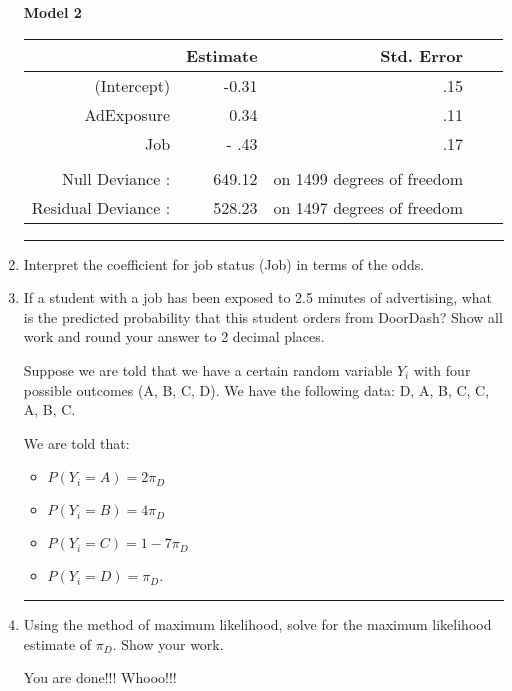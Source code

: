 \documentclass[11pt]{article}
\begin{document}
\begin{enumerate}
\pagebreak



\textbf{Model 2} 

\begin{center}
\begin{tabular}{rrrrr}
  \hline
             & Estimate & Std. Error \\
  \hline
(Intercept)    & -0.31 & .15    \\
 AdExposure    & 0.34 & .11 \\
 Job           & - .43 & .17 \\ 
  \hline
  & & \\ 
  Null Deviance : & 649.12 &  on 1499 degrees of freedom \\
  Residual Deviance : & 528.23 &   on 1497 degrees of freedom \\
\end{tabular}
\end{center}

\rule{\textwidth}{1pt}

\item Interpret the coefficient for job status (Job) in terms of the odds. 

\vspace{3cm}

\item If a student with a job has been exposed to 2.5 minutes of advertising, what is the predicted probability that this student orders from DoorDash? Show all work and round your answer to 2 decimal places. 


\pagebreak



Suppose we are told that we have a certain random variable $Y_i$ with four possible outcomes (A, B, C, D). We have the following data: D, A, B, C, C, A, B, C.

We are told that:

\begin{itemize}
\item $P(Y_i = A) = 2{\pi}_{D}$
\item $P(Y_i = B) = 4 {\pi}_{D}$
\item $P(Y_i = C) = 1 - 7 {\pi}_{D}$
\item $P(Y_i = D) = \pi_D$. 
\end{itemize} 

\rule{\textwidth}{1pt}


\item Using the method of maximum likelihood, solve for the maximum likelihood estimate of $\pi_{D}$. Show your work.  

\pagebreak



\huge{You are done!!! Whooo!!!}




\end{enumerate}
\end{document}
